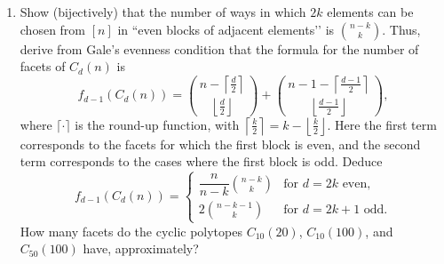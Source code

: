 \documentclass{article}
\begin{document}
\begin{enumerate}
\begin{proof} The following is Gale's evenness condition. Note that it is an "if and only if" statement.
\begin{theorem*}
Let $n > d \ge 2$. We will use $[n]$ to denote the set $\{1,\dots,n\}$,
and choose real parameters $t_1 < t_2 < \cdots < t_n$.

The cyclic polytope
\[
  C_d(n) = \operatorname{conv}\{x(t_1),\dots,x(t_n)\}
\]
is a simplicial $d$-polytope. A $d$-subset $S \subseteq [n]$ forms a facet of $C_d(n)$ if and only if the following “evenness condition’’ is satisfied:

If $i < j$ are not in $S$, then the number of $k \in S$ between $i$ and $j$
is even:
\[
  2 \mid \#\{k : k \in S,\ i < k < j\}
  \quad\text{for } i,j \notin S.
\]
\end{theorem*}

From this condition, we can observe that for every set $S \subseteq [n]$, $|S| \leq \lfloor \frac{d}{2} \rfloor$, we can pick another set of at most $\lfloor \frac{d}{2} \rfloor$ numbers such that the numbers in $S$ are paired up with adjacent numbers. The rest can be put at an end of $[n]$. Since $C_d(n)$ is simplicial, any facet must be the $d-1$ simplex, and thus since $S$ is a subset of the vertex set of this simplex, it must be a face. It follows that the cyclic polytopes are $\lfloor \frac{d}{2} \rfloor$-neighborly.
\end{proof}
\item Show (bijectively) that the number of ways in which $2k$ elements can be chosen from $[n]$ in “even blocks of adjacent elements’’ is $\binom{n-k}{k}$. Thus, derive from Gale’s evenness condition that the formula for the number of facets of $C_d(n)$ is
\[
f_{d-1}(C_d(n))=\binom{\,n-\left\lceil\frac d2\right\rceil\,}{\left\lfloor\frac d2\right\rfloor}+\binom{\,n-1-\left\lceil\frac{d-1}2\right\rceil\,}{\left\lfloor\frac{d-1}2\right\rfloor},
\]
where $\lceil\cdot\rceil$ is the round-up function, with $\left\lceil\frac{k}{2}\right\rceil=k-\left\lfloor\frac{k}{2}\right\rfloor$. Here the first term corresponds to the facets for which the first block is even, and the second term corresponds to the cases where the first block is odd. Deduce
\[
f_{d-1}(C_d(n))=
\begin{cases}
\dfrac{n}{n-k}\binom{n-k}{k} & \text{for } d=2k \text{ even},\\[4pt]
2\binom{n-k-1}{k} & \text{for } d=2k+1 \text{ odd}.
\end{cases}
\]
How many facets do the cyclic polytopes $C_{10}(20)$, $C_{10}(100)$, and $C_{50}(100)$ have, approximately?


\end{enumerate}
\end{document}
